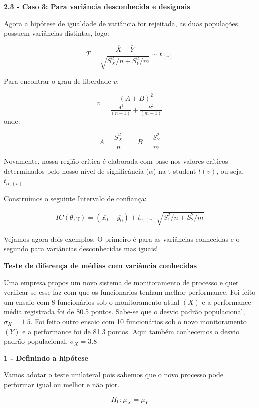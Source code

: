 \documentclass[
  letterpaper,
  DIV=11,
  numbers=noendperiod]{scrartcl}
\begin{document}
\textbf{2.3 - Caso 3: Para variância desconhecida e desiguais}

Agora a hipótese de igualdade de variância for rejeitada, as duas
populações possuem variâncias distintas, logo:

\[T=\frac{\overline{X}-\overline{Y}}{\sqrt{S_X^2/n+S_Y^2/m}}\sim t_{(v)}\]

Para encontrar o grau de liberdade \(v\):

\[v=\frac{(A+B)^2}{\frac{A^2}{(n-1)}+\frac{B^2}{(m-1)}}\] onde:

\[A=\frac{S_X^2}{n} \qquad B=\frac{S_Y^2}{m}\]

Novamente, nossa região crítica é elaborada com base nos valores
críticos determinados pelo nosso nível de significância (\(\alpha\)) na
t-student \(t(v)\), ou seja, \(t_{\alpha,(v)}\)

Construímos o seguinte Intervalo de confiança:

\[\begin{array}{ccc}
IC(\theta;\gamma)=(\overline{x_0}-\overline{y_0})\pm t_{\gamma,(v)}\sqrt{S_1^2/n+S_2^2/m}
\end{array}\]

Vejamos agora dois exemplos. O primeiro é para as variâncias conhecidas
e o segundo para variâncias desconhecidas mas iguais!

\begin{exemplo}

\textbf{Teste de diferença de médias com variância conhecidas}

Uma empresa propos um novo sistema de monitoramento de processo e quer
verificar se esse faz com que os funcionarios tenham melhor performance.
Foi feito um ensaio com 8 funcionários sob o monitoramento atual \((X)\)
e a performance média registrada foi de 80.5 pontos. Sabe-se que o
desvio padrão populacional, \(\sigma_X=1.5\). Foi feito outro ensaio com
10 funcionários sob o novo monitoramento \((Y)\) e a performance foi de
81.3 pontos. Aqui também conhecemos o desvio padrão populacional,
\(\sigma_X=3.8\)

\end{exemplo}

\vspace{0.5cm}

\textbf{1 - Definindo a hipótese}

Vamos adotar o teste unilateral pois sabemos que o novo processo pode
performar igual ou melhor e não pior.

\[H_0: \mu_X=\mu_Y\]
\end{document}

